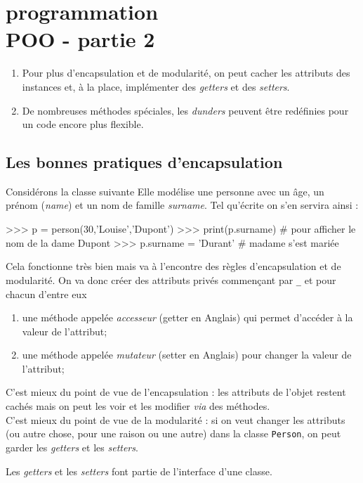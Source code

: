 \documentclass[a4paper,12pt,french]{book}
\begin{document}
	
	\chapter{\large programmation\\[-1em]\fontsize{35pt}{42pt}\selectfont\titlefont POO - partie 2}
\begin{aretenir}
	\begin{enumerate}[--]
		\item 	Pour plus d'encapsulation et de modularité, on peut \og cacher \fg{} les attributs des instances et, à la place, implémenter des \textit{getters} et des \textit{setters}.
		\item 	De nombreuses méthodes spéciales, les \textit{dunders} peuvent être redéfinies pour un code encore plus flexible.
	\end{enumerate}
\end{aretenir}
\section{Les bonnes pratiques d'encapsulation}
Considérons la classe suivante
Elle modélise une personne avec un âge, un prénom (\textit{name}) et un nom de famille \textit{surname}. Tel qu'écrite on s'en servira ainsi :
\begin{pythonshell}
>>> p = person(30,'Louise','Dupont')
>>> print(p.surname) # pour afficher le nom de la dame
Dupont
>>> p.surname = 'Durant' # madame s'est mariée
\end{pythonshell}
Cela fonctionne très bien mais va à l'encontre des règles d'encapsulation et de modularité. On va donc créer des attributs privés commençant par \og\texttt{\_}\fg{} et pour chacun d'entre eux 
\begin{enumerate}[--]
	\item 	une méthode appelée \textit{accesseur} (getter en Anglais) qui permet d'accéder à la valeur de l'attribut;
	\item 	une méthode appelée \textit{mutateur} (setter en Anglais) pour changer la valeur de l'attribut;	
\end{enumerate}

C'est mieux du point de vue de l'encapsulation : les attributs de l'objet restent cachés mais on peut les voir et les modifier \textit{via} des méthodes.\\
C'est mieux du point de vue de la modularité : si on veut changer les attributs (ou autre chose, pour une raison ou une autre) dans la classe \texttt{Person}, on peut garder les \textit{getters} et les \textit{setters}.
\begin{remarque}[]
	Les \textit{getters} et les \textit{setters} font partie de l'interface d'une classe.
\end{remarque}
\end{document}
